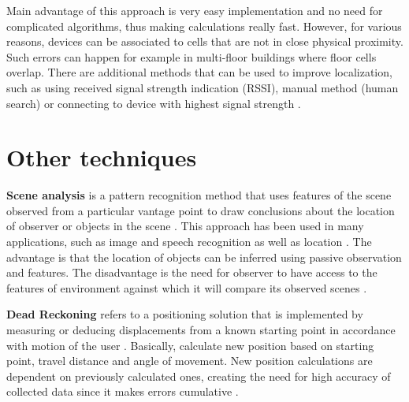 Main advantage of this approach is very easy implementation and no need for complicated algorithms, thus making calculations really fast. However, for various reasons, devices can be associated to cells that are not in close physical proximity. Such errors can happen for example in multi-floor buildings where floor cells overlap. There are additional methods that can be used to improve localization, such as using received signal strength indication (RSSI), manual method (human search) or connecting to device with highest signal strength \cite{WiFiLBS, RAinWILTaS}.

\section{Other techniques}
\textbf{Scene analysis} is a pattern recognition method that uses features of the scene observed from a particular vantage point to draw conclusions about the location of observer or objects in the scene \cite{LSfUC}. This approach has been used in many applications, such as image and speech recognition as well as location \cite{LSAWIFI}. The advantage is that the location of objects can be inferred using passive observation and features. The disadvantage is the need for observer to have access to the features of environment against which it will compare its observed scenes \cite{LSfUC}.

\medskip

\textbf{Dead Reckoning} refers to a positioning solution that is implemented by measuring or deducing displacements from a known starting point in accordance with motion of the user \cite{DRNS}. Basically, calculate new position based on starting point, travel distance and angle of movement. New position calculations are dependent on previously calculated ones, creating the need for high accuracy of collected data since it makes errors cumulative \cite{IDRAIP}.
